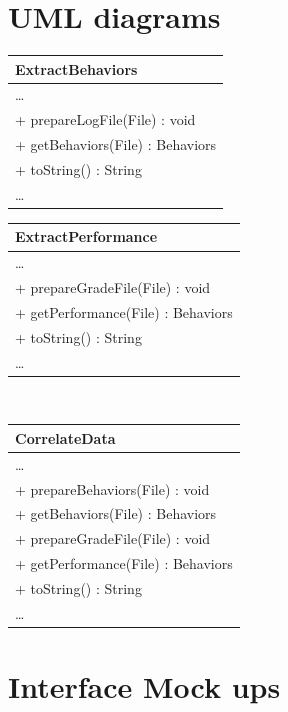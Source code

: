 \documentclass[12pt]{article}
\begin{document}
\section{UML diagrams}
\begin{tabularx}{7cm}{|X|}
	\hline
	ExtractBehaviors \\
	\hline
	\dots \\
	\hline
	+ prepareLogFile(File) : void\\
	+ getBehaviors(File) : Behaviors\\
	+ toString() : String\\
	\dots \\
	\hline
\end{tabularx}
\hfil 
\begin{tabularx}{7cm}{|X|}
	\hline
	ExtractPerformance \\
	\hline
	\dots \\
	\hline
	+ prepareGradeFile(File) : void\\
	+ getPerformance(File) : Behaviors\\
	+ toString() : String \\
	\dots \\
	\hline
\end{tabularx}
\\ \hfill \break
\begin{tabularx}{7cm}{|X|}
	\hline
	CorrelateData \\
	\hline
	\dots \\
	\hline
	+ prepareBehaviors(File) : void\\
	+ getBehaviors(File) : Behaviors\\
	+ prepareGradeFile(File) : void\\
	+ getPerformance(File) : Behaviors\\
	+ toString() : String \\
	\dots \\
	\hline
\end{tabularx}
\pagebreak
\section{Interface Mock ups}
\end{document}
